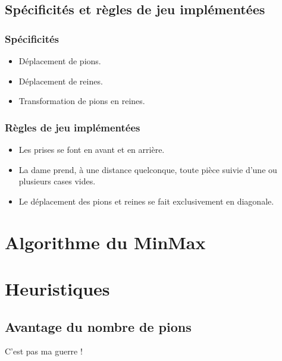 \documentclass[10pt,a4paper]{report}
\begin{document}
	\subsection{Spécificités et règles de jeu implémentées}
		\subsubsection{Spécificités}
		
		\begin{itemize}[label = $\blacktriangleright$]
		\item Déplacement de pions.
		\item Déplacement de reines.
		\item Transformation de pions en reines.
		\end{itemize}
		
		\subsubsection{Règles de jeu implémentées}
		
		\begin{itemize}[label = $\blacktriangleright$]
		\item Les prises se font en avant et en arrière.
		\item La dame prend, à une distance quelconque, toute pièce suivie d'une ou plusieurs cases vides.
		\item Le déplacement des pions et reines se fait exclusivement en diagonale.
		\end{itemize}
\section{Algorithme du MinMax}

\section{Heuristiques}

	\subsection{Avantage du nombre de pions}
	 C'est pas ma guerre !
\end{document}
